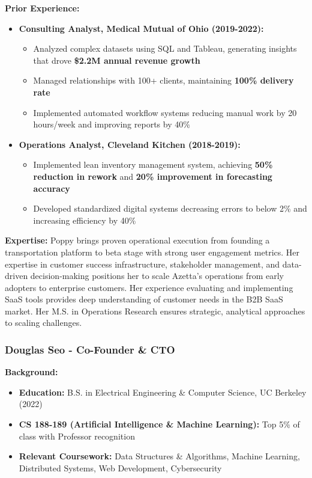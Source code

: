 \textbf{Prior Experience:}
\begin{itemize}[noitemsep]
    \item \textbf{Consulting Analyst, Medical Mutual of Ohio (2019-2022):}
    \begin{itemize}[noitemsep]
        \item Analyzed complex datasets using SQL and Tableau, generating insights that drove \textbf{\$2.2M annual revenue growth}
        \item Managed relationships with 100+ clients, maintaining \textbf{100\% delivery rate}
        \item Implemented automated workflow systems reducing manual work by 20 hours/week and improving reports by 40\%
    \end{itemize}
    \item \textbf{Operations Analyst, Cleveland Kitchen (2018-2019):}
    \begin{itemize}[noitemsep]
        \item Implemented lean inventory management system, achieving \textbf{50\% reduction in rework} and \textbf{20\% improvement in forecasting accuracy}
        \item Developed standardized digital systems decreasing errors to below 2\% and increasing efficiency by 40\%
    \end{itemize}
\end{itemize}

\textbf{Expertise:} Poppy brings proven operational execution from founding a transportation platform to beta stage with strong user engagement metrics. Her expertise in customer success infrastructure, stakeholder management, and data-driven decision-making positions her to scale Azetta's operations from early adopters to enterprise customers. Her experience evaluating and implementing SaaS tools provides deep understanding of customer needs in the B2B SaaS market. Her M.S. in Operations Research ensures strategic, analytical approaches to scaling challenges.


\subsubsection{Douglas Seo - Co-Founder \& CTO}

\textbf{Background:}
\begin{itemize}[noitemsep]
    \item \textbf{Education:} B.S. in Electrical Engineering \& Computer Science, UC Berkeley (2022)
    \item \textbf{CS 188-189 (Artificial Intelligence \& Machine Learning):} Top 5\% of class with Professor recognition
    \item \textbf{Relevant Coursework:} Data Structures \& Algorithms, Machine Learning, Distributed Systems, Web Development, Cybersecurity
\end{itemize}

